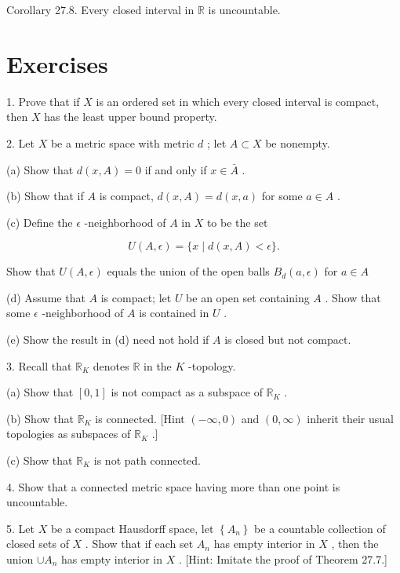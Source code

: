 Corollary 27.8. Every closed interval in \(\mathbb{R}\) is uncountable.

\section*{Exercises}

1. Prove that if \(X\) is an ordered set in which every closed interval is compact, then \(X\) has the least upper bound property.

2. Let \(X\) be a metric space with metric \(d\) ; let \(A \subset  X\) be nonempty.

(a) Show that \(d\left( {x,A}\right)  = 0\) if and only if \(x \in  \bar{A}\) .

(b) Show that if \(A\) is compact, \(d\left( {x,A}\right)  = d\left( {x,a}\right)\) for some \(a \in  A\) .

(c) Define the \(\epsilon\) -neighborhood of \(A\) in \(X\) to be the set

\[
U\left( {A,\epsilon }\right)  = \{ x \mid  d\left( {x,A}\right)  < \epsilon \} .
\]

Show that \(U\left( {A,\epsilon }\right)\) equals the union of the open balls \({B}_{d}\left( {a,\epsilon }\right)\) for \(a \in  A\)

(d) Assume that \(A\) is compact; let \(U\) be an open set containing \(A\) . Show that some \(\epsilon\) -neighborhood of \(A\) is contained in \(U\) .

(e) Show the result in (d) need not hold if \(A\) is closed but not compact.

3. Recall that \({\mathbb{R}}_{K}\) denotes \(\mathbb{R}\) in the \(K\) -topology.

(a) Show that \(\left\lbrack  {0,1}\right\rbrack\) is not compact as a subspace of \({\mathbb{R}}_{K}\) .

(b) Show that \({\mathbb{R}}_{K}\) is connected. [Hint \(\left( {-\infty ,0}\right)\) and \(\left( {0,\infty }\right)\) inherit their usual topologies as subspaces of \({\mathbb{R}}_{K}\) .]

(c) Show that \({\mathbb{R}}_{K}\) is not path connected.

4. Show that a connected metric space having more than one point is uncountable.

5. Let \(X\) be a compact Hausdorff space, let \(\left\{  {A}_{n}\right\}\) be a countable collection of closed sets of \(X\) . Show that if each set \({A}_{n}\) has empty interior in \(X\) , then the union \(\cup  {A}_{n}\) has empty interior in \(X\) . [Hint: Imitate the proof of Theorem 27.7.]

